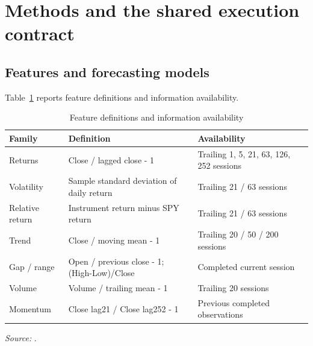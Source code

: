 \documentclass[11pt,a4paper]{article}
\begin{document}

\section{Methods and the shared execution contract}\label{sec:section-04}

\subsection{Features and forecasting models}

\noindent Table~\ref{tab:2} reports feature definitions and information availability.

\begin{table}[!htbp]\centering\footnotesize\setlength{\tabcolsep}{3pt}\renewcommand{\arraystretch}{1.14}
\caption{Feature definitions and information availability}\label{tab:2}
\begin{tabular}{@{}>{\raggedright\arraybackslash}p{}>{\raggedright\arraybackslash}p{}>{\raggedright\arraybackslash}p{}@{}}
\toprule
\textbf{Family} & \textbf{Definition} & \textbf{Availability} \\
\midrule
Returns & Close /\allowbreak{} lagged close - 1 & Trailing 1, 5, 21, 63, 126, 252 sessions \\
Volatility & Sample standard deviation of daily return & Trailing 21 /\allowbreak{} 63 sessions \\
Relative return & Instrument return minus SPY return & Trailing 21 /\allowbreak{} 63 sessions \\
Trend & Close /\allowbreak{} moving mean - 1 & Trailing 20 /\allowbreak{} 50 /\allowbreak{} 200 sessions \\
Gap /\allowbreak{} range & Open /\allowbreak{} previous close - 1; (High-Low)/\allowbreak{}Close & Completed current session \\
Volume & Volume /\allowbreak{} trailing mean - 1 & Trailing 20 sessions \\
Momentum & Close lag21 /\allowbreak{} Close lag252 - 1 & Previous completed observations \\
\bottomrule\end{tabular}\par\smallskip
\raggedright\textit{Source:} .
\end{table}
\end{document}
